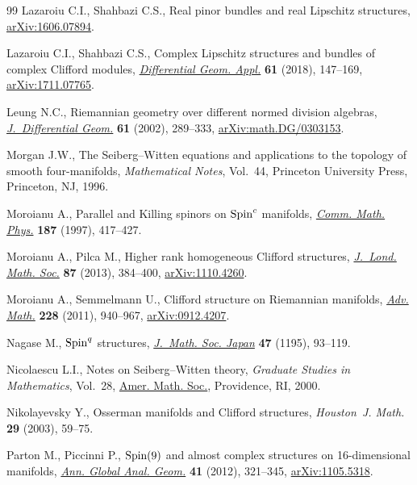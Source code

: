 \documentclass[pdftex]{sigma}
\numberwithin{equation}{section}
\begin{document}
\begin{thebibliography}{99}
Lazaroiu C.I., Shahbazi C.S., Real pinor bundles and real {L}ipschitz
 structures, \href{https://arxiv.org/abs/1606.07894}{arXiv:1606.07894}.

Lazaroiu C.I., Shahbazi C.S., Complex {L}ipschitz structures and bundles of
 complex {C}lifford modules, \href{https://doi.org/10.1016/j.difgeo.2018.08.006}{\textit{Differential Geom. Appl.}} \textbf{61}
 (2018), 147--169, \href{https://arxiv.org/abs/1711.07765}{arXiv:1711.07765}.

Leung N.C., Riemannian geometry over different normed division algebras,
 \href{https://doi.org/10.4310/jdg/1090351387}{\textit{J.~Differential Geom.}} \textbf{61} (2002), 289--333,
 \href{https://arxiv.org/abs/math.DG/0303153}{arXiv:math.DG/0303153}.

Morgan J.W., The {S}eiberg--{W}itten equations and applications to the topology
 of smooth four-manifolds, \textit{Mathematical Notes}, Vol.~44, Princeton
 University Press, Princeton, NJ, 1996.

Moroianu A., Parallel and {K}illing spinors on {${\rm Spin}^c$} manifolds,
 \href{https://doi.org/10.1007/s002200050142}{\textit{Comm. Math. Phys.}} \textbf{187} (1997), 417--427.

Moroianu A., Pilca M., Higher rank homogeneous {C}lifford structures,
 \href{https://doi.org/10.1112/jlms/jds061}{\textit{J.~Lond. Math. Soc.}} \textbf{87} (2013), 384--400,
 \href{https://arxiv.org/abs/1110.4260}{arXiv:1110.4260}.

Moroianu A., Semmelmann U., Clifford structure on {R}iemannian manifolds,
 \href{https://doi.org/10.1016/j.aim.2011.06.006}{\textit{Adv. Math.}} \textbf{228} (2011), 940--967, \href{https://arxiv.org/abs/0912.4207}{arXiv:0912.4207}.

Nagase M., ${\rm Spin}^q$ structures, \href{https://doi.org/10.2969/jmsj/04710093}{\textit{J.~Math. Soc. Japan}}
 \textbf{47} (1195), 93--119.

Nicolaescu L.I., Notes on {S}eiberg--{W}itten theory, \textit{Graduate Studies
 in Mathematics}, Vol.~28, \href{https://doi.org/10.1090/gsm/028}{Amer. Math. Soc.}, Providence, RI, 2000.

Nikolayevsky Y., Osserman manifolds and {C}lifford structures,
 \textit{Houston~J. Math.} \textbf{29} (2003), 59--75.

Parton M., Piccinni P., {$\rm Spin(9)$} and almost complex structures on
 16-dimensional manifolds, \href{https://doi.org/10.1007/s10455-011-9285-x}{\textit{Ann. Global Anal. Geom.}} \textbf{41}
 (2012), 321--345, \href{https://arxiv.org/abs/1105.5318}{arXiv:1105.5318}.


\end{thebibliography}
\end{document}

